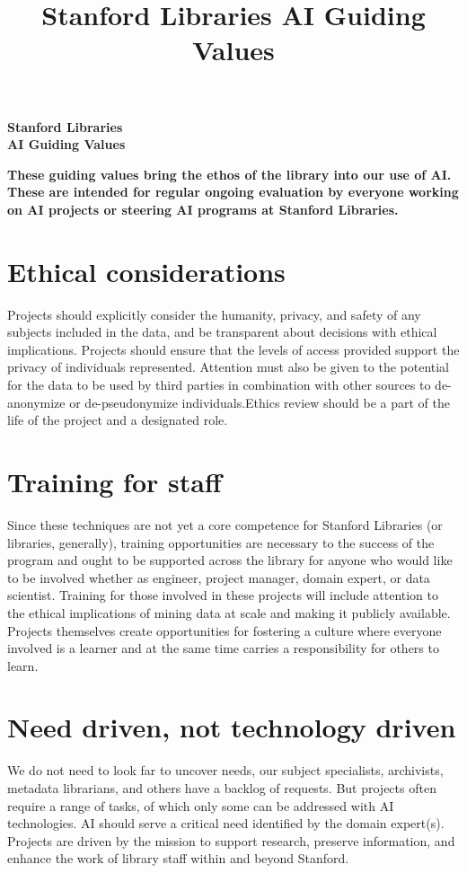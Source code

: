 \documentclass[11pt,letterpaper]{article}
\title{Stanford Libraries AI Guiding Values}
\begin{document}
\begin{multicols}{2}

{\textbf{\huge Stanford Libraries \\ AI Guiding Values}}

\columnbreak

{\textbf{\small These guiding values bring the ethos of the library into our use of AI. These are intended for regular ongoing evaluation by everyone working on AI projects or steering AI programs at Stanford Libraries.}}
\end{multicols}


\section*{Ethical considerations}
Projects should explicitly consider the humanity, privacy, and safety of any subjects included in the data, and be transparent about decisions with ethical implications. Projects should ensure that the levels of access provided support the privacy of individuals represented.  Attention must also be given to the potential for the data to be used by third parties in combination with other sources to de-anonymize or de-pseudonymize individuals.Ethics review should be a part of the life of the project and a designated role.
\section*{Training for staff}
Since these techniques are not yet a core competence for Stanford Libraries (or libraries, generally), training opportunities are necessary to the success of the program and ought to be supported across the library for anyone who would like to be involved whether as engineer, project manager, domain expert, or data scientist. Training for those involved in these projects will include attention to the ethical implications of mining data at scale and making it publicly available. Projects themselves create opportunities for fostering a culture where everyone involved is a learner and at the same time carries a responsibility for others to learn. 
\section*{Need driven, not technology driven}
We do not need to look far to uncover needs, our subject specialists, archivists, metadata librarians, and others have a backlog of requests. But projects often require a range of tasks, of which only some can be addressed with AI technologies. AI should serve a critical need identified by the domain expert(s). Projects are driven by the mission to support research, preserve information, and enhance the work of library staff within and beyond Stanford.
\end{document}
